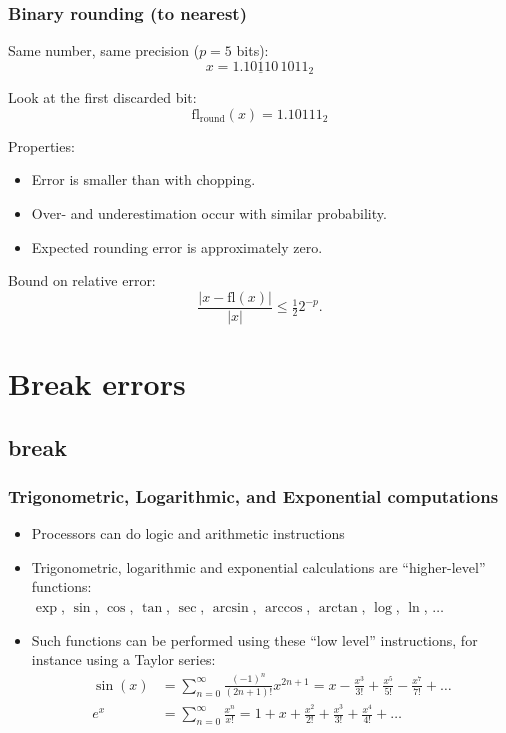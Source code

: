 \begin{frame}
  \frametitle{Binary rounding (to nearest)}

  Same number, same precision ($p=5$ bits):
  \[
    x = 1.\underline{10110}\,1011_2
  \]

  Look at the first discarded bit:
  \[
    \mathrm{fl}_{\text{round}}(x) = 1.10111_2
  \]

  Properties:
  \begin{itemize}
    \item Error is smaller than with chopping.
    \item Over- and underestimation occur with similar probability.
    \item Expected rounding error is approximately zero.
  \end{itemize}

  Bound on relative error:
  \[
    \frac{|x-\mathrm{fl}(x)|}{|x|} \le \tfrac{1}{2} 2^{-p}.
  \]
\end{frame}


\section{Break errors}
\subsection*{break}
\begin{frame}
   \frametitle{Trigonometric, Logarithmic, and Exponential computations}
    \begin{itemize}
      \item Processors can do logic and arithmetic instructions
      \item Trigonometric, logarithmic and exponential calculations are ``higher-level'' functions:\\
      $\exp$, $\sin$, $\cos$, $\tan$, $\sec$, $\arcsin$, $\arccos$, $\arctan$, $\log$, $\ln$, $\ldots$
       \item Such functions can be performed using these ``low level'' instructions, for instance using a Taylor series:
      \begin{align*}
        \sin(x) &= \sum_{n=0}^{\infty} \frac{(-1)^n}{(2n+1)!}x^{2n+1} =  x - \frac{x^3}{3!} + \frac{x^5}{5!} - \frac{x^7}{7!} + \ldots \\
         e^x &= \sum_{n=0}^\infty \frac{x^n}{x!} = 1 + x + \frac{x^2}{2!} + \frac{x^3}{3!} + \frac{x^4}{4!} + \ldots
      \end{align*}
    \end{itemize}
\end{frame}

